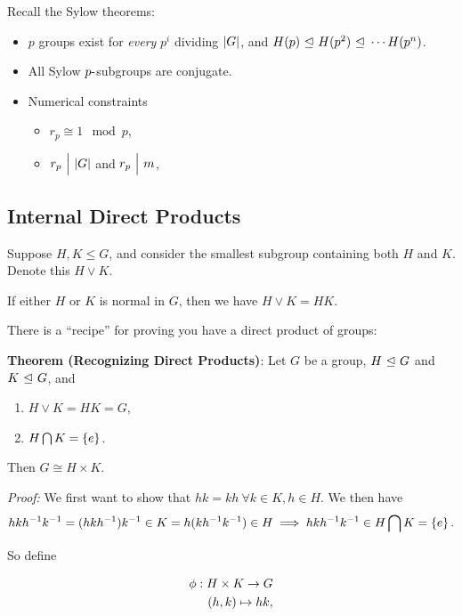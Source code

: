 Recall the Sylow theorems:

\begin{itemize}
\item
  \(p\) groups exist for \emph{every} \(p^i\) dividing \({\left\lvert {G} \right\rvert}\), and
  \(H(p) {~\trianglelefteq~} H(p^2) {~\trianglelefteq~} \cdots H(p^n)\).
\item
  All Sylow \(p{\hbox{-}}\)subgroups are conjugate.
\item
  Numerical constraints

  \begin{itemize}
  \item
    \(r_p \cong 1 \mod p\),
  \item
    \(r_p {~\Bigm| ~} {\left\lvert {G} \right\rvert}\) and \(r_p {~\Bigm| ~} m\),
  \end{itemize}
\end{itemize}

\hypertarget{internal-direct-products}{%
\subsection{Internal Direct Products}\label{internal-direct-products}}

Suppose \(H, K \leq G\), and consider the smallest subgroup containing
both \(H\) and \(K\). Denote this \(H \vee K\).

If either \(H\) or \(K\) is normal in \(G\), then we have
\(H\vee K = HK\).

There is a ``recipe'' for proving you have a direct product of groups:

\textbf{Theorem (Recognizing Direct Products)}: Let \(G\) be a group,
\(H {~\trianglelefteq~} G\) and \(K{~\trianglelefteq~} G\), and

\begin{enumerate}
\def\labelenumi{\arabic{enumi}.}
\item
  \(H\vee K = HK = G\),
\item
  \(H \bigcap K = \left\{{e}\right\}\).
\end{enumerate}

Then \(G \cong H \times K\).

\emph{Proof:} We first want to show that
\(hk = kh ~\forall k\in K, h\in H\). We then have \[
hkh^{-1} k^{-1} = (hkh^{-1})k^{-1} \in K = h(kh^{-1} k^{-1}) \in H \implies hkh^{-1} k^{-1} \in H\bigcap K = \left\{{e}\right\}.
\]

So define

\begin{align*}
\phi: H \times K \to G \\
(h, k) \mapsto hk
,\end{align*}

